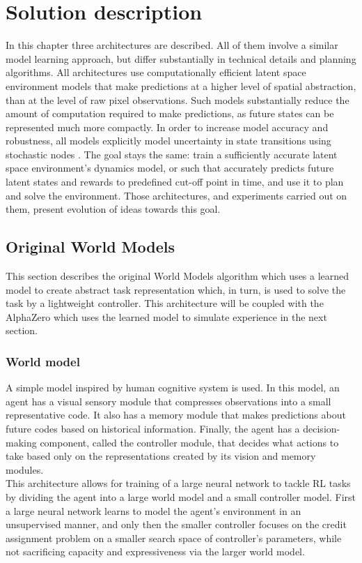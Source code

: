 \section{Solution description} \label{Sec.SolutionDescription}

In this chapter three architectures are described. All of them involve a similar model learning approach, but differ substantially in technical details and planning algorithms. All architectures use computationally efficient latent space environment models that make predictions at a higher level of spatial abstraction, than at the level of raw pixel observations. Such models substantially reduce the amount of computation required to make predictions, as future states can be represented much more compactly. In order to increase model accuracy and robustness, all models explicitly model uncertainty in state transitions using stochastic nodes \cite{Algo.FastGenerativeModels}.
The goal stays the same: train a sufficiently accurate latent space environment's dynamics model, or such that accurately predicts future latent states and rewards to predefined cut-off point in time, and use it to plan and solve the environment. Those architectures, and experiments carried out on them, present evolution of ideas towards this goal.

\subsection{Original World Models}

This section describes the original World Models \cite{Algo.WorldModels} algorithm which uses a learned model to create abstract task representation which, in turn, is used to solve the task by a lightweight controller. This architecture will be coupled with the AlphaZero which uses the learned model to simulate experience in the next section.

\subsubsection{World model}

A simple model inspired by human cognitive system is used. In this model, an agent has a visual sensory module that compresses observations into a small representative code. It also has a memory module that makes predictions about future codes based on historical information. Finally, the agent has a decision-making component, called the controller module, that decides what actions to take based only on the representations created by its vision and memory modules. \\
This architecture allows for training of a large neural network to tackle RL tasks by dividing the agent into a large world model and a small controller model. First a large neural network learns to model the agent’s environment in an unsupervised manner, and only then the smaller controller focuses on the credit assignment problem on a smaller search space of controller's parameters, while not sacrificing capacity and expressiveness via the larger world model.

